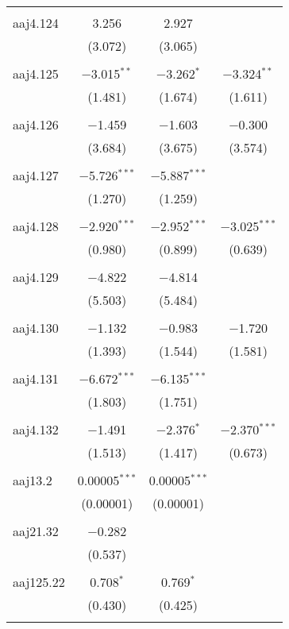 \begin{table}[!htbp]
\begin{tabular}{@{\extracolsep{5pt}}lccc}
  & & & \\ 
 aaj4.124 & 3.256 & 2.927 &  \\ 
  & (3.072) & (3.065) &  \\ 
  & & & \\ 
 aaj4.125 & $-$3.015$^{**}$ & $-$3.262$^{*}$ & $-$3.324$^{**}$ \\ 
  & (1.481) & (1.674) & (1.611) \\ 
  & & & \\ 
 aaj4.126 & $-$1.459 & $-$1.603 & $-$0.300 \\ 
  & (3.684) & (3.675) & (3.574) \\ 
  & & & \\ 
 aaj4.127 & $-$5.726$^{***}$ & $-$5.887$^{***}$ &  \\ 
  & (1.270) & (1.259) &  \\ 
  & & & \\ 
 aaj4.128 & $-$2.920$^{***}$ & $-$2.952$^{***}$ & $-$3.025$^{***}$ \\ 
  & (0.980) & (0.899) & (0.639) \\ 
  & & & \\ 
 aaj4.129 & $-$4.822 & $-$4.814 &  \\ 
  & (5.503) & (5.484) &  \\ 
  & & & \\ 
 aaj4.130 & $-$1.132 & $-$0.983 & $-$1.720 \\ 
  & (1.393) & (1.544) & (1.581) \\ 
  & & & \\ 
 aaj4.131 & $-$6.672$^{***}$ & $-$6.135$^{***}$ &  \\ 
  & (1.803) & (1.751) &  \\ 
  & & & \\ 
 aaj4.132 & $-$1.491 & $-$2.376$^{*}$ & $-$2.370$^{***}$ \\ 
  & (1.513) & (1.417) & (0.673) \\ 
  & & & \\ 
 aaj13.2 & 0.00005$^{***}$ & 0.00005$^{***}$ &  \\ 
  & (0.00001) & (0.00001) &  \\ 
  & & & \\ 
 aaj21.32 & $-$0.282 &  &  \\ 
  & (0.537) &  &  \\ 
  & & & \\ 
 aaj125.22 & 0.708$^{*}$ & 0.769$^{*}$ &  \\ 
  & (0.430) & (0.425) &  \\ 
  & & & \\ 

\end{tabular}
\end{table}
